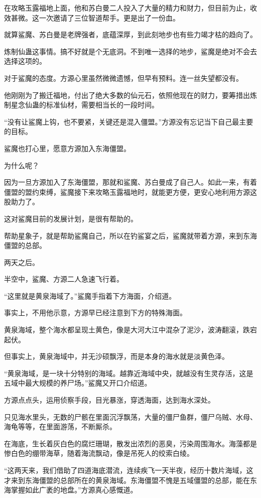 \begin{this_body}
在攻略玉露福地上面，他和苏白曼二人投入了大量的精力和财力，但目前为止，收效甚微。这一次邀请了三位智道帮手。更是出了一份血。

就算鲨魔、苏白曼是老牌强者，底蕴深厚，到此刻地步也有些力竭才枯的趋向了。

炼制仙蛊这事情。搞不好就是个无底洞。不到唯一选择的地步，鲨魔是绝对不会去选择这项的。

对于鲨魔的态度。方源心里虽然微微遗憾，但早有预料。连一丝失望都没有。

他刚刚为了搬迁福地，付出了绝大多数的仙元石，依照他现在的财力，要筹措出炼制星念仙蛊的标准仙材，需要相当长的一段时间。

“没有让鲨魔上钩，也不要紧，关键还是混入僵盟。”方源没有忘记当下自己最主要的目标。

鲨魔也打心里，愿意方源加入东海僵盟。

为什么呢？

因为一旦方源加入了东海僵盟，那就和鲨魔、苏白曼成了自己人。如此一来，有着僵盟的盟约束缚，鲨魔接下来攻略玉露福地时，就能更方便，更安心地利用方源这股助力了。

这对鲨魔目前的发展计划，是很有帮助的。

帮助星象子，就是帮助鲨魔自己，所以在钓鲨宴之后，鲨魔就带着方源，来到东海僵盟的总部。

两天之后。

半空中，鲨魔、方源二人急速飞行着。

“这里就是黄泉海域了。”鲨魔手指着下方海面，介绍道。

事实上，不用他示意，方源早已经注意到下方的特殊海面。

黄泉海域，整个海水都呈现土黄色，像是大河大江中混杂了泥沙，波涛翻滚，跌宕起伏。

但事实上，黄泉海域中，并无沙硕飘浮，而是本身的海水就是淡黄色泽。

“黄泉海域，是一块十分特别的海域。越靠近海域中央，就越没有生灵存活，这是五域中最大规模的养尸场。”鲨魔又开口介绍道。

方源点点头，运用侦察手段，目光暴涨，穿透海面，达到海水深处。

只见海水里头，无数的尸骸在里面沉浮飘荡，大量的僵尸鱼群，僵尸乌贼、水母、海龟等等，在里面游荡，不断厮杀。

在海底，生长着灰白色的腐烂珊瑚，散发出浓烈的恶臭，污染周围海水。海藻都是惨白色的绷带海草，随着海流飘动，像是吊死人的绞索白绫。

“这两天来，我们借助了四道海底潜流，连续疾飞一天半夜，经历十数片海域，这才来到东海僵盟的总部所在的黄泉海域。东海僵盟不愧是五域僵盟的总部，能在东海掌握如此广袤的地盘。”方源真心感慨道。


\end{this_body}

